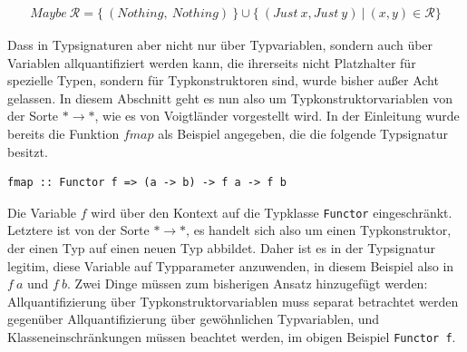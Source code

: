 \begin{align*}
Maybe\ \mathcal{R} = \{~(Nothing,\ Nothing)~\} \cup \{~(Just\ x, Just\ y)~|~(x, y) \in \mathcal{R} \}
\end{align*}

Dass in Typsignaturen aber nicht nur über Typvariablen, sondern auch über Variablen allquantifiziert werden kann, die
ihrerseits nicht Platzhalter für spezielle Typen, sondern für Typkonstruktoren sind, wurde bisher außer Acht gelassen. In diesem
Abschnitt geht es nun also um Typkonstruktorvariablen von der Sorte $* \rightarrow *$, wie es von Voigtländer \cite{voigtlander}
vorgestellt wird. In der Einleitung wurde bereits die Funktion $fmap$ als Beispiel angegeben, die die folgende Typsignatur besitzt.



\begin{verbatim}
fmap :: Functor f => (a -> b) -> f a -> f b
\end{verbatim}

Die Variable $f$ wird über den Kontext auf die Typklasse \texttt{Functor} eingeschränkt. Letztere ist von der Sorte $* \rightarrow *$,
es handelt sich also um einen Typkonstruktor, der einen Typ auf einen neuen Typ abbildet.
Daher ist es in der Typsignatur legitim, diese Variable auf Typparameter anzuwenden, in diesem Beispiel also in $f\ a$ und $f\ b$.
Zwei Dinge müssen zum bisherigen Ansatz hinzugefügt werden: Allquantifizierung über Typkonstruktorvariablen muss separat betrachtet werden gegenüber Allquantifizierung über gewöhnlichen Typvariablen,
und Klasseneinschränkungen müssen beachtet werden, im obigen Beispiel \texttt{Functor\ f}.


